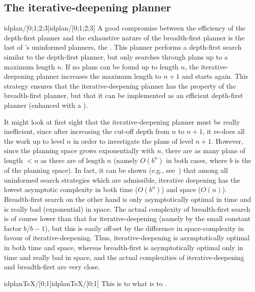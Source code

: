 \subsection {The iterative-deepening planner}
\begin{predicate}{idplan/[0;1;2;3]}{idplan/[0;1;2;3]}
A good compromise between the efficiency of the depth-first planner
and the exhaustive nature of the breadth-first planner is the last of
{\clam}'s uninformed planners, the .
This planner performs a depth-first search similar to the depth-first
planner, but only searches through plans up to a maximum length $n$.
If no plans can be found up to length $n$, the iterative-deepening
planner increases the maximum length to $n+1$ and starts again. This
strategy ensures that the iterative-deepening planner has the
 property of the
breadth-first planner, but that it can be implemented as an efficient
depth-first planner (enhanced with a ).

It might look at first sight that the iterative-deepening planner must
be really inefficient, since after increasing the cut-off depth from
$n$ to $n+1$, it re-does all the work up to level $n$ in order to
investigate the plans of level $n+1$. However, since the planning
space grows exponentially with $n$, there are as many plans of length
$<n$ as there are of length $n$ (namely $O(b^n)$ in both cases, where
$b$ is the  of the planning space).
In fact, it can be shown (e.g., see~\cite{korf}) that among all
uninformed search strategies which are admissible,
iterative deepening has the lowest asymptotic complexity in both time
($O(b^n)$) and space ($O(n)$).  Breadth-first search
on the other hand is only asymptotically optimal in time and is really
bad (exponential) in space. The actual complexity of breadth-first
search is of course lower than that for iterative-deepening (namely by
the small constant factor $b/b-1$), but this is easily off-set by the
difference in space-complexity in favour of iterative-deepening. Thus,
iterative-deepening is asymptotically optimal in both time and space,
whereas breadth-first is asymptotically optimal only in time and
really bad in space, and the actual complexities of iterative-deepening and
breadth-first are very close.
\end{predicate}

\begin{predicate}{idplanTeX/[0;1]}{idplanTeX/[0;1]}
This is to  what  is to
.  
\end{predicate}

